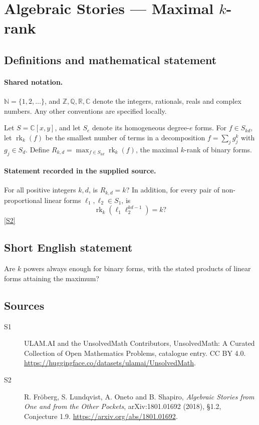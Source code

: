 \documentclass[11pt]{article}
\newcommand{\sref}[2]{\hyperlink{source:#1:#2}{[S#2]}}
\begin{document}
\section{Algebraic Stories — Maximal $k$-rank}\label{statement}

\subsection{Definitions and mathematical statement}

\paragraph{Shared notation.}$\mathbb N=\{1,2,\ldots\}$, and $\mathbb Z,\mathbb Q,\mathbb R,\mathbb C$ denote the integers, rationals, reals and complex numbers. Any other conventions are specified locally.


Let $S=\mathbb C[x,y]$, and let $S_e$ denote its homogeneous degree-$e$ forms. For $f\in S_{kd}$, let $\operatorname{rk}_k(f)$ be the smallest number of terms in a decomposition $f=\sum_jg_j^k$ with $g_j\in S_d$. Define $R_{k,d}=\max_{f\in S_{kd}}\operatorname{rk}_k(f)$, the maximal $k$-rank of binary forms.
\paragraph{Statement recorded in the supplied source.}
For all positive integers $k,d$, is $R_{k,d}=k$? In addition, for every pair of non-proportional linear forms $\ell_1,\ell_2\in S_1$, is
\[\operatorname{rk}_k(\ell_1\ell_2^{kd-1})=k?\] \sref{statement}{2}
\subsection{Short English statement}
Are $k$ powers always enough for binary forms, with the stated products of linear forms attaining the maximum?
\subsection{Sources}
\begin{description}
\item[\hypertarget{source:statement:1}{S1}] ULAM.AI and the UnsolvedMath Contributors, UnsolvedMath: A Curated Collection of Open Mathematics Problems, catalogue entry. CC BY 4.0. \url{https://huggingface.co/datasets/ulamai/UnsolvedMath}.
\item[\hypertarget{source:statement:2}{S2}] R. Fröberg, S. Lundqvist, A. Oneto and B. Shapiro, \emph{Algebraic Stories from One and from the Other Pockets}, arXiv:1801.01692 (2018), §1.2, Conjecture 1.9. \url{https://arxiv.org/abs/1801.01692}.
\end{description}
\label{end:statement}
\end{document}
